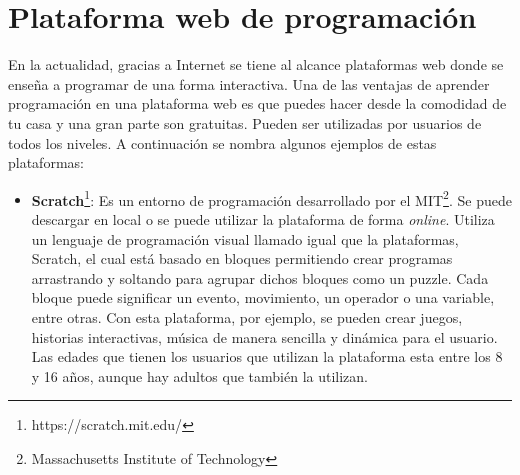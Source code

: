 \section{Plataforma web de programación}
En la actualidad, gracias a Internet se tiene al alcance plataformas web donde se enseña a programar de una forma interactiva. Una de las ventajas de aprender programación en una plataforma web es que puedes hacer desde la comodidad de tu casa y una gran parte son gratuitas. Pueden ser utilizadas por usuarios de todos los niveles. A continuación se nombra algunos ejemplos de estas plataformas:
\begin{itemize}
\item \textbf{Scratch}\footnote{https://scratch.mit.edu/}: Es un entorno de programación desarrollado por el MIT\footnote{Massachusetts Institute of Technology}. Se puede descargar en local o se puede utilizar la plataforma de forma \textit{online}. Utiliza  un lenguaje de programación visual llamado igual que la plataformas, Scratch, el cual está basado en bloques permitiendo crear programas arrastrando y soltando para agrupar dichos bloques como un puzzle. Cada bloque puede significar un evento, movimiento, un operador o una variable, entre otras. Con esta plataforma, por ejemplo,  se pueden crear juegos, historias interactivas, música de manera sencilla y dinámica para el usuario. Las edades que tienen los usuarios que utilizan la plataforma esta entre los 8 y 16 años, aunque hay adultos que también la utilizan\cite{scratch}.
\end{itemize}

